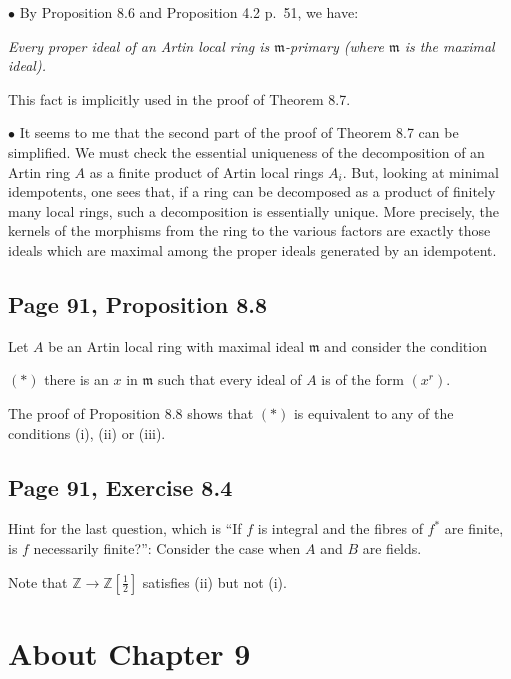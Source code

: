 \documentclass[parskip=half,fontsize=12pt]{scrartcl}%
\newcommand{\mf}{\mathfrak}
\newcommand{\mmm}{\mf m}
\newcommand{\bu}{\bullet}
\begin{document}
$\bu$ By Proposition 8.6 and Proposition 4.2 p.~51, we have:

\emph{Every proper ideal of an Artin local ring is $\mmm$-primary (where $\mmm$ is the maximal ideal).} 

This fact is implicitly used in the proof of Theorem 8.7.

$\bu$ It seems to me that the second part of the proof of Theorem 8.7 can be simplified. We must check the essential uniqueness of the decomposition of an Artin ring $A$ as a finite product of Artin local rings $A_i$. But, looking at minimal idempotents, one sees that, if a ring can be decomposed as a product of finitely many local rings, such a decomposition is essentially unique. More precisely, the kernels of the morphisms from the ring to the various factors are exactly those ideals which are maximal among the proper ideals generated by an idempotent. %

\subsection{Page 91, Proposition 8.8}\label{88}%

Let $A$ be an Artin local ring with maximal ideal $\mmm$ and consider the condition

$(*)$ there is an $x$ in $\mmm$ such that every ideal of $A$ is of the form $(x^r)$. 

The proof of Proposition 8.8 shows that $(*)$ is equivalent to any of the conditions (i), (ii) or (iii). 

\subsection{Page 91, Exercise 8.4}%

Hint for the last question, which is ``If $f$ is integral and the fibres of $f^*$ are finite, is $f$ necessarily finite?'': Consider the case when $A$ and $B$ are fields. 

Note that $\mathbb Z\to\mathbb Z[\frac12]$ satisfies (ii) but not (i). 

\section{About Chapter 9}%
\end{document}
